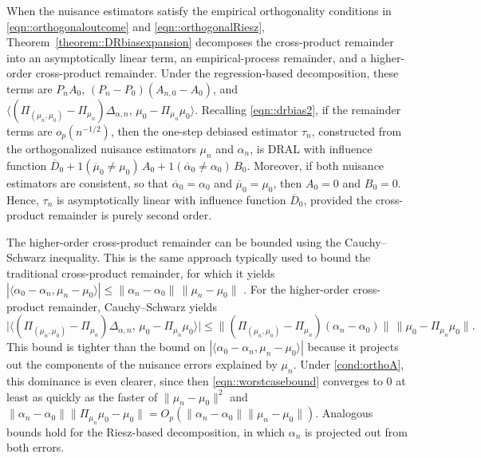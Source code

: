 \documentclass[11pt]{article}
\theoremstyle{plain}
\begin{document}
When the nuisance estimators satisfy the empirical orthogonality conditions in \eqref{eqn::orthogonaloutcome} and \eqref{eqn::orthogonalRiesz}, Theorem~\ref{theorem::DRbiasexpansion} decomposes the cross-product remainder into an asymptotically linear term, an empirical-process remainder, and a higher-order cross-product remainder. Under the regression-based decomposition, these terms are \(P_nA_0\), \((P_n-P_0)(A_{n,0}-A_0)\), and \(\langle (\Pi_{(\mu_n,\mu_0)}-\Pi_{\mu_n})\Delta_{\alpha,n},\, \mu_0-\Pi_{\mu_n}\mu_0\rangle\).  Recalling \eqref{eqn::drbias2}, if the remainder terms are \(o_p(n^{-1/2})\), then the one-step debiased estimator \(\tau_n\), constructed from the orthogonalized nuisance estimators \(\mu_n\) and \(\alpha_n\), is DRAL with influence function \(\overline{D}_0 + 1(\overline{\mu}_0 \neq \mu_0)\,A_0 + 1(\overline{\alpha}_0 \neq \alpha_0)\,B_0\).  Moreover, if both nuisance estimators are consistent, so that \(\overline{\alpha}_0=\alpha_0\) and \(\overline{\mu}_0=\mu_0\), then \(A_0=0\) and \(B_0=0\). Hence, \(\tau_n\) is asymptotically linear with influence function \(\overline{D}_0\), provided the cross-product remainder is purely second order.


 


The higher-order cross-product remainder can be bounded using the Cauchy--Schwarz inequality. This is the same approach typically used to bound the traditional cross-product remainder, for which it yields $|\langle \alpha_0 - \alpha_n, \mu_n - \mu_0 \rangle|
\le \|\alpha_n-\alpha_0\|\,\|\mu_n - \mu_0\|$
\citep{vanderLaanRose2011, chernozhukov2018double, bonvini2024doubly}. For the higher-order cross-product remainder, Cauchy--Schwarz yields
\begin{equation}
 \big|
 \langle (\Pi_{(\mu_n, \mu_0)} - \Pi_{\mu_n})\Delta_{\alpha,n},
  \,\mu_0 - \Pi_{\mu_n} \mu_0 \rangle
 \big|
 \leq
 \| (\Pi_{(\mu_n, \mu_0)} - \Pi_{\mu_n})(\alpha_n - \alpha_0)\|\,
 \|\mu_0 - \Pi_{\mu_n} \mu_0\|.
 \label{eqn::worstcasebound}
\end{equation}
This bound is tighter than the bound on \(|\langle \alpha_0 - \alpha_n, \mu_n - \mu_0 \rangle|\) because it projects out the components of the nuisance errors explained by \(\mu_n\). Under \ref{cond:orthoA}, this dominance is even clearer, since then \eqref{eqn::worstcasebound} converges to $0$ at least as quickly as the faster of $\|\mu_n - \mu_0 \|^2$ and $\|\alpha_n - \alpha_0\|\|\Pi_{\mu_n}\mu_0 - \mu_0 \|=O_p(\|\alpha_n-\alpha_0\|\|\mu_n - \mu_0\|)$. Analogous bounds hold for the Riesz-based decomposition, in which \(\alpha_n\) is projected out from both errors.
\end{document}
